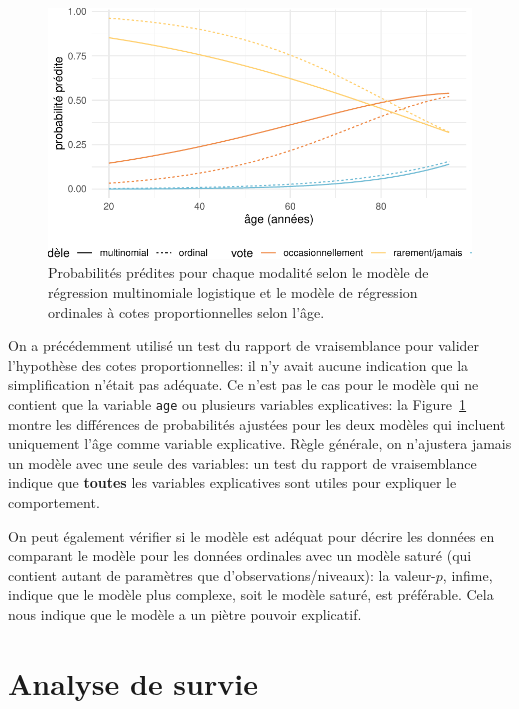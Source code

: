 \documentclass[
  11pt,
  letterpaper,
]{book}
\theoremstyle{definition}
\theoremstyle{remark}
\begin{document}
\begin{figure}[ht!]

{\centering \includegraphics{./05-reglogistique_files/figure-pdf/fig-predmultinom-1.pdf}

}

\caption{\label{fig-predmultinom}Probabilités prédites pour chaque
modalité selon le modèle de régression multinomiale logistique et le
modèle de régression ordinales à cotes proportionnelles selon l'âge.}

\end{figure}

On a précédemment utilisé un test du rapport de vraisemblance pour
valider l'hypothèse des cotes proportionnelles: il n'y avait aucune
indication que la simplification n'était pas adéquate. Ce n'est pas le
cas pour le modèle qui ne contient que la variable \texttt{age} ou
plusieurs variables explicatives: la Figure~\ref{fig-predmultinom}
montre les différences de probabilités ajustées pour les deux modèles
qui incluent uniquement l'âge comme variable explicative. Règle
générale, on n'ajustera jamais un modèle avec une seule des variables:
un test du rapport de vraisemblance indique que \textbf{toutes} les
variables explicatives sont utiles pour expliquer le comportement.

On peut également vérifier si le modèle est adéquat pour décrire les
données en comparant le modèle pour les données ordinales avec un modèle
saturé (qui contient autant de paramètres que d'observations/niveaux):
la valeur-\(p\), infime, indique que le modèle plus complexe, soit le
modèle saturé, est préférable. Cela nous indique que le modèle a un
piètre pouvoir explicatif.


\hypertarget{analyse-survie}{%
\chapter{Analyse de survie}\label{analyse-survie}}
\end{document}
